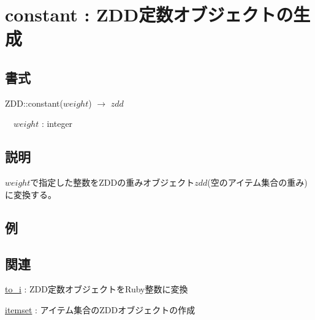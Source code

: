 
\section{constant : ZDD定数オブジェクトの生成\label{sect:constant}}
\subsection*{書式}
ZDD::constant($weight$) $\rightarrow$ $zdd$

~~$weight$ : integer

\subsection*{説明}
$weight$で指定した整数をZDDの重みオブジェクト$zdd$(空のアイテム集合の重み)に変換する。

\subsection*{例}


\subsection*{関連}
\hyperref[sect:to_i]{to\_i} : ZDD定数オブジェクトをRuby整数に変換

\hyperref[sect:itemset]{itemset} : アイテム集合のZDDオブジェクトの作成

